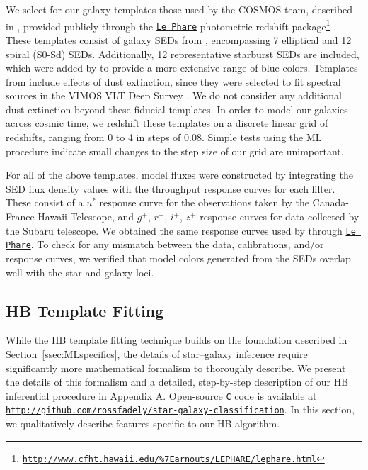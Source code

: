 \documentclass[12pt,preprint]{aastex}
\begin{document}
We select for our galaxy templates those used by the COSMOS team,
described in \citep{ilbert09}, provided publicly through the
\href{http://www.cfht.hawaii.edu/\%7Earnouts/LEPHARE/lephare.html}
{\texttt{Le Phare}} photometric redshift package\footnote{
\href{http://www.cfht.hawaii.edu/\%7Earnouts/LEPHARE/lephare.html}
{\tt http://www.cfht.hawaii.edu/\%7Earnouts/LEPHARE/lephare.html}}
\citep{arnouts99,ilbert06}.  These templates consist of galaxy SEDs
from \citet{polletta07}, encompassing 7 elliptical and 12 spiral
(S0-Sd) SEDs.  Additionally, 12 representative starburst SEDs are
included, which were added by \citet{ilbert09} to provide a more
extensive range of blue colors.  Templates from \citet{polletta07}
include effects of dust extinction, since they were selected to fit
spectral sources in the VIMOS VLT Deep Survey \citep{lefevre05}.  We
do not consider any additional dust extinction beyond these fiducial
templates.  In order to model our galaxies across cosmic time, we
redshift these templates on a discrete linear grid of redshifts,
ranging from 0 to 4 in steps of 0.08.  Simple tests using the ML
procedure indicate small changes to the step size of our grid are
unimportant. 

For all of the above templates, model fluxes were constructed by 
integrating the SED flux density values with the throughput response 
curves for each filter.  These consist of a $u^\ast$ response curve for 
the observations taken by the Canada-France-Hawaii Telescope, and 
$g^+$, $r^+$, $i^+$, $z^+$ response curves for data 
collected by the Subaru telescope.  We obtained the same response 
curves used by \citet{ilbert09} through 
\href{http://www.cfht.hawaii.edu/\%7Earnouts/LEPHARE/lephare.html}
{\texttt{Le Phare}}\footnotemark[5].  To check for any mismatch between 
the data, calibrations, and/or response curves, we verified that model 
colors generated from the SEDs overlap well with the star and galaxy loci.

\subsection{HB Template Fitting}
\label{ssec:HBspecifics}

While the HB template fitting technique builds on the foundation
described in Section~\ref{ssec:MLspecifics}, the details of
star--galaxy inference require significantly more mathematical
formalism to thoroughly describe.  We present the details of this
formalism and a detailed, step-by-step description of our HB
inferential procedure in Appendix A.  Open-source \texttt{C} code is
available at {\footnotesize
  \texttt{\url{http://github.com/rossfadely/star-galaxy-classification}}}.
In this section, we qualitatively describe features specific to our HB
algorithm.
\end{document}
